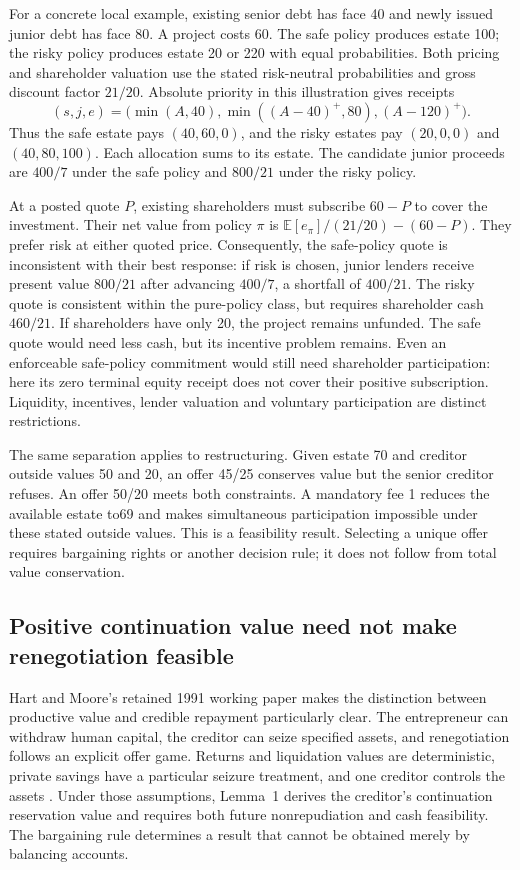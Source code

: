 \documentclass[11pt,a4paper]{article}
\newcommand{\E}{\mathbb E}
\begin{document}
For a concrete local example, existing senior debt has face 40 and newly issued
junior debt has face 80. A project costs 60. The safe policy produces estate 100;
the risky policy produces estate 20 or 220 with equal probabilities. Both pricing
and shareholder valuation use the stated risk-neutral probabilities and gross
discount factor $21/20$. Absolute priority in this illustration gives receipts
\begin{equation}
(s,j,e)=\bigl(\min(A,40),\min((A-40)^+,80),(A-120)^+\bigr).
\end{equation}
Thus the safe estate pays $(40,60,0)$, and the risky estates pay $(20,0,0)$
and $(40,80,100)$. Each allocation sums to its estate. The candidate junior
proceeds are $400/7$ under the safe policy and $800/21$ under the risky policy.

At a posted quote $P$, existing shareholders must subscribe $60-P$ to cover
the investment. Their net value from policy $\pi$ is
$\E[e_\pi]/(21/20)-(60-P)$. They prefer risk at either quoted price.
Consequently, the safe-policy quote is inconsistent with their best response:
if risk is chosen, junior lenders receive present value $800/21$ after advancing
$400/7$, a shortfall of $400/21$. The risky quote is consistent within the
pure-policy class, but requires shareholder cash $460/21$. If shareholders
have only 20, the project remains unfunded. The safe quote would need less cash,
but its incentive problem remains. Even an enforceable safe-policy commitment
would still need shareholder participation: here its zero terminal equity
receipt does not cover their positive subscription. Liquidity, incentives,
lender valuation and voluntary participation are distinct restrictions.

The same separation applies to restructuring. Given estate 70 and creditor
outside values 50 and 20, an offer 45/25 conserves value but the senior creditor
refuses. An offer 50/20 meets both constraints. A mandatory fee 1 reduces the
available estate to69 and makes simultaneous participation impossible under
these stated outside values. This is a feasibility result. Selecting a unique
offer requires bargaining rights or another decision rule; it does not follow
from total value conservation.

\subsection{Positive continuation value need not make renegotiation feasible}
Hart and Moore's retained 1991 working paper makes the distinction between
productive value and credible repayment particularly clear. The entrepreneur
can withdraw human capital, the creditor can seize specified assets, and
renegotiation follows an explicit offer game. Returns and liquidation values
are deterministic, private savings have a particular seizure treatment, and
one creditor controls the assets \cite[Sections~2--3 and Appendix~A1--A4]{hartmoore}.
Under those assumptions, Lemma~1 derives the creditor's continuation reservation
value and requires both future nonrepudiation and cash feasibility. The bargaining
rule determines a result that cannot be obtained merely by balancing accounts.
\end{document}
